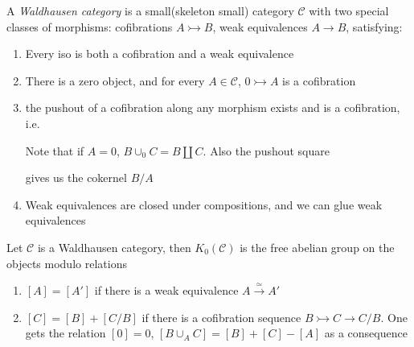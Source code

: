 \documentclass[main]{subfiles}
\begin{document}
\begin{definition}
A \textit{Waldhausen category} is a small(skeleton small) category $\mathscr C$ with two special classes of morphisms: cofibrations $A\rightarrowtail B$, weak equivalences $A\to B$, satisfying:
\begin{enumerate}
\item Every iso is both a cofibration and a weak equivalence
\item There is a zero object, and for every $A\in\mathscr C$, $0\rightarrowtail A$ is a cofibration
\item the pushout of a cofibration along any morphism exists and is a cofibration, i.e.
\begin{center}
\end{center}
Note that if $A=0$, $B\cup_0 C=B\coprod C$. Also the pushout square
\begin{center}
\end{center}
gives us the cokernel $B/A$
\item Weak equivalences are closed under compositions, and we can glue weak equivalences
\begin{center}
\end{center}
\end{enumerate}
\end{definition}

\begin{definition}
Let $\mathscr C$ is a Waldhausen category, then $K_0(\mathcal C)$ is the free abelian group on the objects modulo relations
\begin{enumerate}
\item $[A]=[A']$ if there is a weak equivalence $A\xrightarrow\simeq A'$
\item $[C]=[B]+[C/B]$ if there is a cofibration sequence $B\rightarrowtail C\to C/B$. One gets the relation $[0]=0$, $[B\cup_AC]=[B]+[C]-[A]$ as a consequence
\end{enumerate}
\end{definition}
\end{document}

